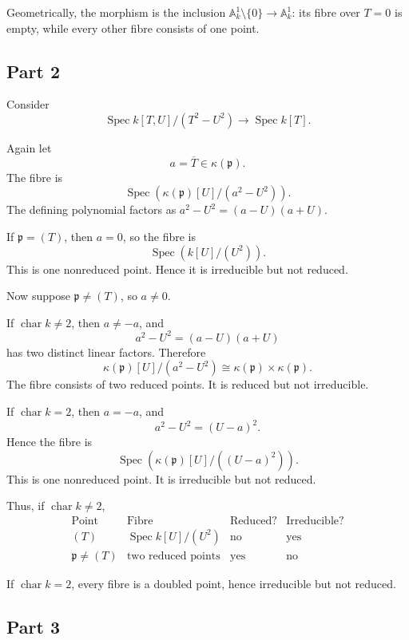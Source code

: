Geometrically, the morphism is the inclusion \(\mathbb A^1_k\setminus\{0\}\to\mathbb A^1_k\): its fibre over \(T=0\) is empty, while every other fibre consists of one point.

\subsection{Part 2}

Consider
\[
\operatorname{Spec} k[T,U]/(T^2-U^2)
\longrightarrow
\operatorname{Spec} k[T].
\]

Again let
\[
a=\overline{T}\in \kappa(\mathfrak{p}).
\]
The fibre is
\[
\operatorname{Spec}
\left(
\kappa(\mathfrak{p})[U]/(a^2-U^2)
\right).
\]
The defining polynomial factors as \(a^2-U^2=(a-U)(a+U)\).

If \(\mathfrak{p}=(T)\), then \(a=0\), so the fibre is
\[
\operatorname{Spec}\left(k[U]/(U^2)\right).
\]
This is one nonreduced point. Hence it is irreducible but not reduced.

Now suppose \(\mathfrak{p}\neq (T)\), so \(a\neq 0\).

If \(\operatorname{char}k\neq 2\), then \(a\neq -a\), and
\[
a^2-U^2=(a-U)(a+U)
\]
has two distinct linear factors. Therefore
\[
\kappa(\mathfrak{p})[U]/(a^2-U^2)
\cong
\kappa(\mathfrak{p})\times \kappa(\mathfrak{p}).
\]
The fibre consists of two reduced points. It is reduced but not
irreducible.

If \(\operatorname{char}k=2\), then \(a=-a\), and
\[
a^2-U^2=(U-a)^2.
\]
Hence the fibre is
\[
\operatorname{Spec}
\left(
\kappa(\mathfrak{p})[U]/((U-a)^2)
\right).
\]
This is one nonreduced point. It is irreducible but not reduced.

Thus, if \(\operatorname{char}k\neq 2\),
\[
\begin{array}{c|c|c|c}
	\text{Point}
	&
	\text{Fibre}
	&
	\text{Reduced?}
	&
	\text{Irreducible?}
	\\
	\hline
	(T)
	&
	\operatorname{Spec}k[U]/(U^2)
	&
	\text{no}
	&
	\text{yes}
	\\
	\mathfrak{p}\neq (T)
	&
	\text{two reduced points}
	&
	\text{yes}
	&
	\text{no}
\end{array}
\]

If \(\operatorname{char}k=2\), every fibre is a doubled point, hence
irreducible but not reduced.

\subsection{Part 3}

